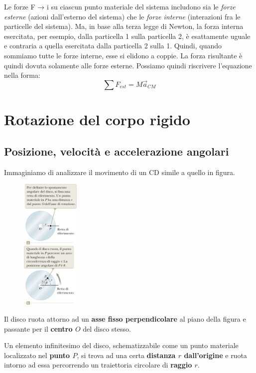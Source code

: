\documentclass[a4paper,11pt,oneside]{book}
\begin{document}
Le forze F → i su ciascun punto materiale del sistema includono sia le \emph{forze esterne} (azioni dall’esterno del sistema) che le \emph{forze interne} (interazioni fra le particelle del sistema).
Ma, in base alla terza legge di Newton, la forza interna esercitata, per esempio, dalla particella 1 sulla particella 2, è esattamente uguale e contraria a quella esercitata dalla particella 2 sulla 1.
Quindi, quando sommiamo tutte le forze interne, esse si elidono a coppie. La forza risultante è quindi dovuta solamente alle forze esterne. Possiamo quindi riscrivere l'equazione nella forma:
\begin{equation*}
    \sum F_{est} = M\vec{a}_{CM}
\end{equation*}

\chapter{Rotazione del corpo rigido}

\section{Posizione, velocità e accelerazione angolari}
Immaginiamo di analizzare il movimento di un CD simile a quello in figura.

\begin{figure}
    \centering
    \includegraphics[width=0.25\textwidth]{cd_rotazione_corpo_rigido.png}
\end{figure}
Il disco ruota attorno ad un \textbf{asse fisso perpendicolare} 
al piano della figura e passante per il \textbf{centro $O$} del disco stesso. 

Un elemento infinitesimo del disco, schematizzabile come un punto 
materiale localizzato nel \textbf{punto $P$}, si trova ad una certa \textbf{distanza $r$ dall’origine} e ruota intorno ad essa percorrendo un traiettoria 
circolare di \textbf{raggio $r$}.
\end{document}
